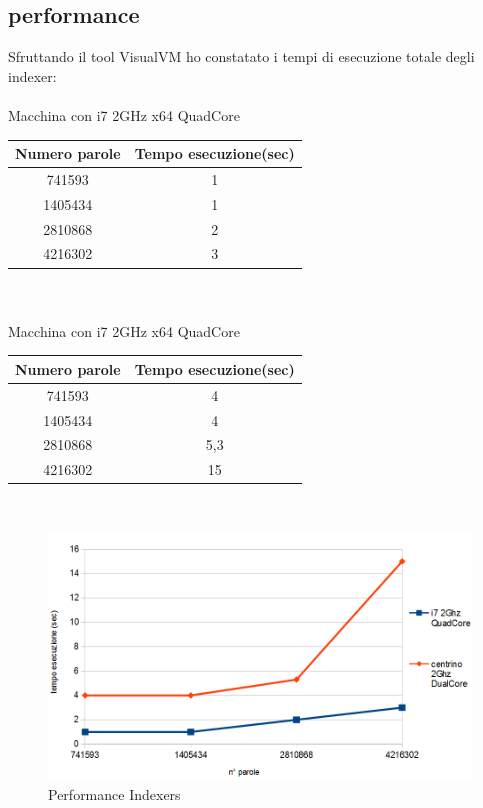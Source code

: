 \documentclass{article}
\begin{document}
\subsection{performance}
Sfruttando il tool VisualVM ho constatato i tempi di esecuzione totale degli indexer:\\ \\
Macchina con i7 2GHz x64 QuadCore
\begin{tabular}{|c|c|}
\hline Numero parole & Tempo esecuzione(sec) \\ 
\hline 741593 & 1 \\ 
\hline 1405434 & 1 \\ 
\hline 2810868 & 2 \\ 
\hline 4216302 & 3 \\ 
\hline 
\end{tabular}  \\ \\
Macchina con i7 2GHz x64 QuadCore
\begin{tabular}{|c|c|}
\hline Numero parole & Tempo esecuzione(sec) \\ 
\hline 741593 & 4 \\ 
\hline 1405434 & 4 \\ 
\hline 2810868 & 5,3 \\ 
\hline 4216302 & 15 \\ 
\hline 
\end{tabular} \\

\begin{figure}[h]
\centering
\includegraphics[width=0.9\linewidth]{./grafico_performance}
\caption[Performance workers]{Performance Indexers}
\label{fig:grafico_performance}
\end{figure}
\end{document}
